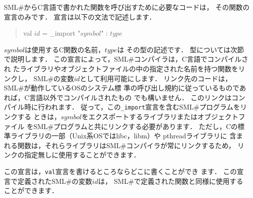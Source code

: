 \documentclass{jbook}
\newcommand{\smlsharp}{SML\#}
\newenvironment{program}{\begin{quote}\begin{tt}}%
                        {\end{tt}\end{quote}}
\begin{document}
\ifjp%
	\smlsharp{}からC言語で書かれた関数を呼び出すために必要なコードは，
その関数の宣言のみです．
	宣言は以下の文法で記述します．
\begin{program}
val $\mathit{id}$ = \_import "$\mathit{symbol}$" : $\mathit{type}$
\end{program}
	$\mathit{symbol}$は使用するC関数の名前，$\mathit{type}$は
その型の記述です．
	型については次節で説明します．
	この宣言によって，\smlsharp{}コンパイラは，C言語でコンパイルされ
たライブラリやオブジェクトファイルの中の指定された名前を持つ関数をリンクし，
\smlsharp{}の変数$\mathit{id}$として利用可能にします．
	リンク先のコードは，\smlsharp{}が動作しているOSのシステム標
準の呼び出し規約に従っているものであれば，C言語以外でコンパイルされたもの
でも構いません．
	このリンクはコンパイル時に行われます．
        従って，この{\tt \_import}宣言を含む\smlsharp{}プログラムをリンクする
ときは，$\mathit{symbol}$をエクスポートするライブラリまたはオブジェクトファイル
を\smlsharp{}プログラムと共にリンクする必要があります．
	ただし，Cの標準ライブラリの一部（Unix系OSではlibc，libm）や
pthreadライブラリに
含まれる関数は，それらライブラリは\smlsharp{}コンパイラが常にリンクするため，
リンクの指定無しに使用することができます．

	この宣言は，{\tt val}宣言を書けるところならどこに書くことができ
ます．
	この宣言で定義された\smlsharp{}の変数$\mathit{id}$は，
\smlsharp{}で定義された関数と同様に使用することができます．
\end{document}
